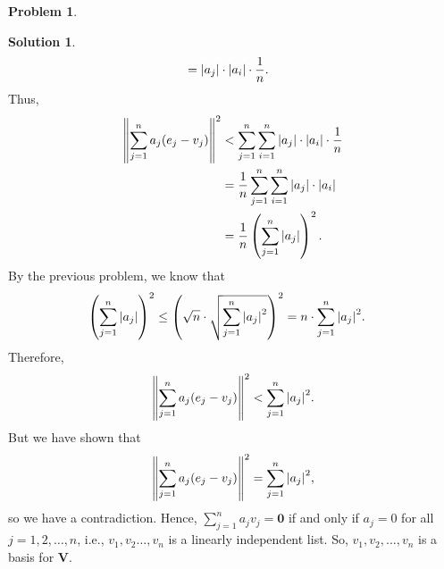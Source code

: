 \documentclass{book}
\theoremstyle{definition}
\newtheorem*{prob*}{Problem}
\newtheorem*{sln*}{Solution}
\newcommand{\V}{\mathbf{V}}
\begin{document}
\begin{prob*}
\begin{enumerate}
\begin{sln*}
\begin{align*}
			&= \abs{a_j}\cdot \abs{a_i}\cdot \frac{1}{n}.
			\end{align*}
			Thus,
			\begin{align*}
			\norm{\sum^n_{j=1} a_j(e_j - v_j)}^2
			&< \sum^n_{j=1}\sum^n_{i=1} \abs{a_j}\cdot \abs{a_i}\cdot \frac{1}{n}\\
			&= \frac{1}{n}\sum^n_{j=1}\sum^n_{i=1} \abs{a_j}\cdot \abs{a_i}\\
			&= \frac{1}{n}\left( \sum^n_{j=1}\vert a_j\vert \right)^2.
			\end{align*}
			By the previous problem, we know that
			\begin{align*}
			\left( \sum^n_{j=1}\vert a_j\vert \right)^2 
			&\leq \left( \sqrt{n}\cdot \sqrt{\sum^n_{j=1}\abs{a_j}^2 } \right)^2
			= n\cdot \sum^n_{j=1}\abs{a_j}^2.
			\end{align*}
			Therefore,
			\begin{align*}
			\norm{\sum^n_{j=1} a_j(e_j - v_j)}^2 < \sum^n_{j=1}\abs{a_j}^2.
			\end{align*}
			But we have shown that
			\begin{align*}
			\norm{\sum^n_{j=1} a_j(e_j - v_j)}^2 = \sum^n_{j=1}\abs{a_j}^2,
			\end{align*}
			so we have a contradiction. Hence, $\sum^n_{j=1}a_jv_j = \mathbf{0}$ if and only if $a_j = 0$ for all $j=1,2,\dots,n$, i.e., $v_1,v_2\dots,v_n$ is a linearly independent list. So, $v_1, v_2,\dots,v_n$ is a basis for $\V$.
		\end{sln*}
	\end{enumerate}
	
\end{prob*}




\newpage
\end{document}
